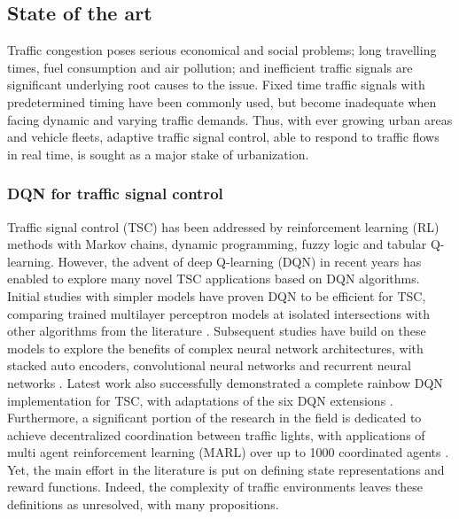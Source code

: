 \documentclass[journal]{IEEEtran}
\begin{document}
\subsection{State of the art}

Traffic congestion poses serious economical and social problems; long travelling times, fuel consumption and air pollution; and inefficient traffic signals are significant underlying root causes to the issue. Fixed time traffic signals with predetermined timing have been commonly used, but become inadequate when facing dynamic and varying traffic demands. Thus, with ever growing urban areas and vehicle fleets, adaptive traffic signal control, able to respond to traffic flows in real time, is sought as a major stake of urbanization. \\

\subsubsection{DQN for traffic signal control}

Traffic signal control (TSC) has been addressed by reinforcement learning (RL) methods with Markov chains, dynamic programming, fuzzy logic \cite{alam2015design} and tabular Q-learning. However, the advent of deep Q-learning (DQN) in recent years has enabled to explore many novel TSC applications based on DQN algorithms. Initial studies with simpler models have proven DQN to be efficient for TSC, comparing trained multilayer perceptron models at isolated intersections with other algorithms from the literature \cite{stevens2016reinforcement,genders2019opensource}. Subsequent studies have build on these models to explore the benefits of complex neural network architectures, with stacked auto encoders, convolutional neural networks and recurrent neural networks \cite{li2016traffic,gao2017adaptative,liang2019deep,wei2018intellilight,vidali2019deep}. Latest work also successfully demonstrated a complete rainbow DQN implementation for TSC, with adaptations of the six DQN extensions \cite{alemzadeh2020adaptative}. Furthermore, a significant portion of the research in the field is dedicated to achieve decentralized coordination between traffic lights, with applications of multi agent reinforcement learning (MARL) over up to 1000 coordinated agents \cite{pol2016coordinated,wei2019presslight,wei2019colight,chen2020toward}. Yet, the main effort in the literature is put on defining state representations and reward functions. Indeed, the complexity of traffic environments leaves these definitions as unresolved, with many propositions. \\
\end{document}
